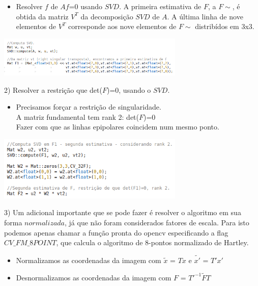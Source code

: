 \documentclass[conference]{IEEEtran}
\begin{document}
\begin{itemize}
	   \item Resolver $f$ de $Af$=0 usando $SVD$. A primeira estimativa de $F$, a $F\sim$, \'e obtida da matriz $V^{T}$
	   da decomposi\c{c}\~ao $SVD$ de $A$. A \'ultima linha de nove elementos de $V^{T}$ corresponde aos nove elementos 
	   de $F\sim$ distrib\'idos em $3$x$3$.
\end{itemize}		  
		
		\vspace{2\baselineskip}\vspace{-\parskip}
		\begin{minipage}{\linewidth}
  		\centering
  		\includegraphics[width=3.5in]{svd1_ok}
		\end{minipage}
	  
\vspace{2\baselineskip}\vspace{-\parskip}
2) Resolver a restri\c{c}\~ao que det($F$)=0, usando o $SVD$.
\begin{itemize}
 \item Precisamos for\c{c}ar a restri\c{c}\~ao de singularidade.
 \\
 A matriz fundamental tem rank 2: det($F$)=0
 \\
 Fazer com que as linhas epipolares coincidem num mesmo ponto.
\end{itemize}

		
		\vspace{2\baselineskip}\vspace{-\parskip}
		\begin{minipage}{\linewidth}
  		\centering
  		\includegraphics[width=3.5in]{svd2}
		\end{minipage}

\vspace{2\baselineskip}\vspace{-\parskip}
3) Um adicional importante que se pode fazer \'e resolver o algoritmo em sua forma $normalizada$, j\'a que n\~ao foram 
considerados fatores de escala. Para isto podemos apenas chamar a fun\c{c}\~ao pronta do opencv especificando a flag 
$CV\_FM\_8POINT$, que calcula o algoritmo de 8-pontos normalizado de Hartley.
\\
\begin{itemize}
 \item Normalizamos as coordenadas da imagem com $\tilde{x}$ = $Tx$ e $\tilde{x'}$ = $T'x'$ 
 \item Desnormalizamos as coordenadas da imagem com $F$ = $T'^{-1}\tilde{F}T$
\end{itemize}
\end{document}
